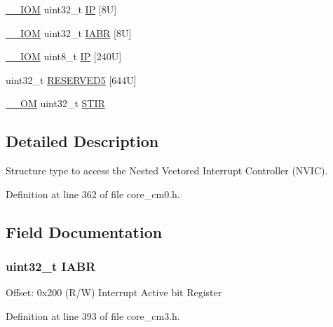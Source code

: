\begin{DoxyCompactItemize}
\item 
\hyperlink{core__sc300_8h_ab6caba5853a60a17e8e04499b52bf691}{\+\_\+\+\_\+\+I\+OM} uint32\+\_\+t \hyperlink{struct_n_v_i_c___type_a1787506107747d2dedae05295d3532da}{IP} \mbox{[}8\+U\mbox{]}
\item 
\hyperlink{core__sc300_8h_ab6caba5853a60a17e8e04499b52bf691}{\+\_\+\+\_\+\+I\+OM} uint32\+\_\+t \hyperlink{struct_n_v_i_c___type_a9dbbeff4da41df476f0718c3ce11ab89}{I\+A\+BR} \mbox{[}8\+U\mbox{]}
\item 
\hyperlink{core__sc300_8h_ab6caba5853a60a17e8e04499b52bf691}{\+\_\+\+\_\+\+I\+OM} uint8\+\_\+t \hyperlink{struct_n_v_i_c___type_a4fda947a8fd3237a89d43b7d5a1057cb}{IP} \mbox{[}240\+U\mbox{]}
\item 
uint32\+\_\+t \hyperlink{struct_n_v_i_c___type_ab94befc6cb8470a5e871cf2c99cb7a6e}{R\+E\+S\+E\+R\+V\+E\+D5} \mbox{[}644\+U\mbox{]}
\item 
\hyperlink{core__sc300_8h_a0ea2009ed8fd9ef35b48708280fdb758}{\+\_\+\+\_\+\+OM} uint32\+\_\+t \hyperlink{struct_n_v_i_c___type_ada9cbba14ab1cc3fddd585f870932db8}{S\+T\+IR}
\end{DoxyCompactItemize}


\subsection{Detailed Description}
Structure type to access the Nested Vectored Interrupt Controller (N\+V\+IC). 

Definition at line 362 of file core\+\_\+cm0.\+h.



\subsection{Field Documentation}
\subsubsection[{\texorpdfstring{I\+A\+BR}{IABR}}]{ uint32\+\_\+t I\+A\+BR}\hypertarget{struct_n_v_i_c___type_a9dbbeff4da41df476f0718c3ce11ab89}{}\label{struct_n_v_i_c___type_a9dbbeff4da41df476f0718c3ce11ab89}
Offset\+: 0x200 (R/W) Interrupt Active bit Register 

Definition at line 393 of file core\+\_\+cm3.\+h.

